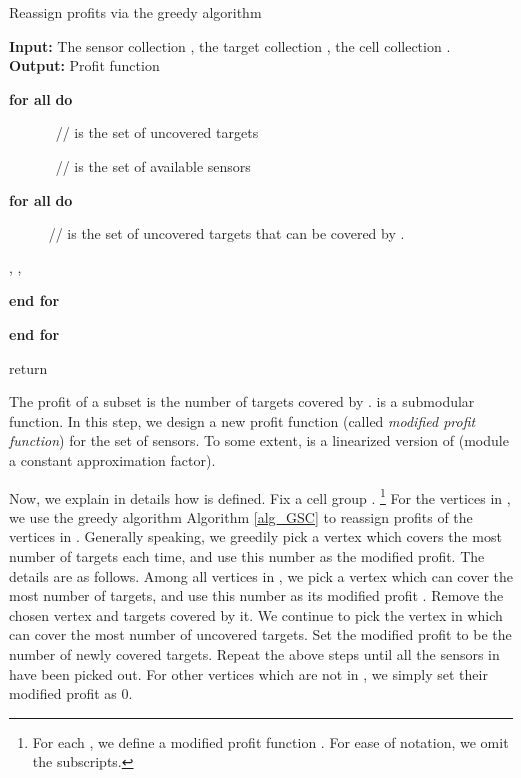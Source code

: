 \documentclass[11pt]{article}
\newcommand{\topic}[1]{\vspace{0.2cm}\noindent{\bf #1 :}}
\begin{document}
\begin{algorithm}[t]
	\label{alg_GSC}
	\caption{Reassign profits via the greedy algorithm}
	\textbf{Input:} The sensor collection , the target collection , the cell collection . \\
	\textbf{Output:} Profit function \begin{enumerate}
		\item \textbf{for all}  \textbf{do}
		{\setlength\itemindent{15pt} \item  ~~~~~~ // is the set of uncovered targets}
		{\setlength\itemindent{15pt} \item   ~~~~~~ // is the set of available sensors\\
			{\setlength\itemindent{15pt} \item \textbf{for all}  \textbf{do} }
			\begin{enumerate}
				{\setlength\itemindent{15pt} \item   ~~~~~
					// is the set of uncovered targets that can be covered by . 		}
				{\setlength\itemindent{15pt} \item ,
					,
					 }		
			\end{enumerate}
		}
		{\setlength\itemindent{15pt} \item \textbf{end for} }
		\item \textbf{end for}
		\item return 
	\end{enumerate}
\end{algorithm}


\topic{Step 1: Reassign profit}
The profit  of a subset  is the number of targets covered by .
 is a submodular function.
In this step,
we design a new profit function (called {\em modified profit function})  for the set of sensors.
To some extent,  is a linearized version of  (module a constant approximation factor).


Now, we explain in details how  is defined.
Fix a cell group .
\footnote{
	For each , we define a modified profit function .
	For ease of notation, we omit the subscripts.
}
For the vertices in , we use the greedy algorithm Algorithm \ref{alg_GSC}
to reassign profits of the vertices in . Generally speaking, we greedily pick a vertex which covers the most number of targets each time, and use this number as the modified profit. The details are as follows.
Among all vertices in ,
we pick a vertex  which can cover the most number of targets,
and use this number as its modified profit .
Remove the chosen vertex and targets covered by it.
We continue to pick the vertex  in  which can cover the most number of uncovered targets.
Set the modified profit  to be the number of newly covered targets.
Repeat the above steps until all the sensors in  have been picked out.
For other vertices  which are not in , we simply set their modified profit  as 0.
\end{document}
